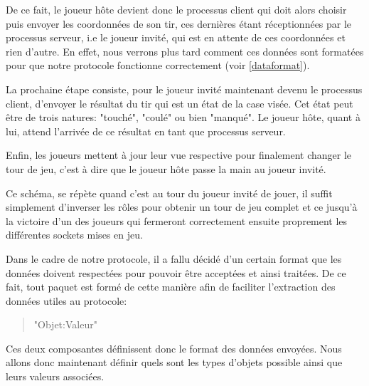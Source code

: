 			De ce fait, le joueur hôte devient donc le processus client qui doit alors choisir puis envoyer les coordonnées de son tir, ces dernières étant réceptionnées par le processus serveur, i.e le joueur invité, qui est en attente de ces coordonnées et rien d'autre. En effet, nous verrons plus tard comment ces données sont formatées pour que notre protocole fonctionne correctement (voir \ref{dataformat}).  \newline
			
			La prochaine étape consiste, pour le joueur invité maintenant devenu le processus client, d'envoyer le résultat du tir qui est un état de la case visée. Cet état peut être de trois natures: "touché", "coulé" ou bien "manqué". Le joueur hôte, quant à lui, attend l'arrivée de ce résultat en tant que processus serveur.\newline \label{states}
			
			Enfin, les joueurs mettent à jour leur vue respective pour finalement changer le tour de jeu, c'est à dire que le joueur hôte passe la main au joueur invité. \newline
			
			Ce schéma, se répète quand c'est au tour du joueur invité de jouer, il suffit simplement d'inverser les rôles pour obtenir un tour de jeu complet et ce jusqu'à la victoire d'un des joueurs qui fermeront correctement ensuite proprement les différentes sockets mises en jeu.
			
		\label{dataformat}
			Dans le cadre de notre protocole, il a fallu décidé d'un certain format que les données doivent respectées pour pouvoir être acceptées et ainsi traitées. De ce fait, tout paquet est formé de cette manière afin de faciliter l'extraction des données utiles au protocole:
			\begin{quote}
				"Objet:Valeur"
			\end{quote}
			Ces deux composantes définissent donc le format des données envoyées. Nous allons donc maintenant définir quels sont les types d'objets possible ainsi que leurs valeurs associées.
			
